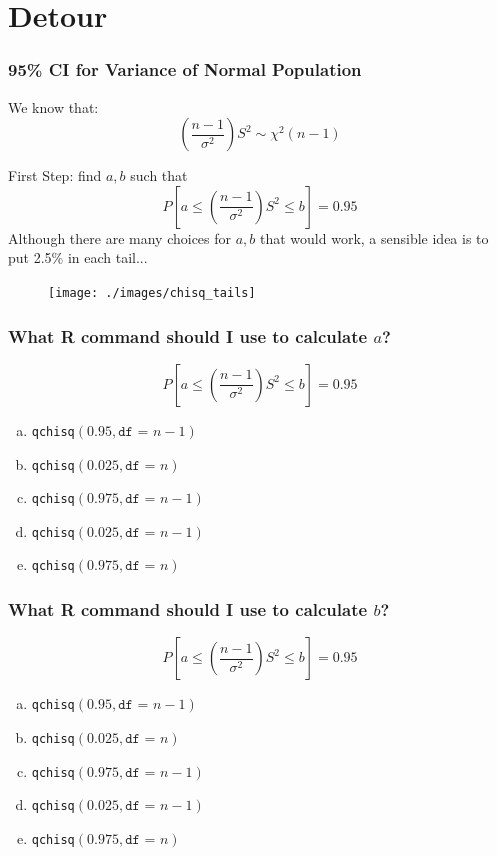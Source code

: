 \documentclass{beamer}
\begin{document}
\section{Detour}
\begin{frame}
\frametitle{95\% CI for Variance of Normal Population}
We know that:
	$$\left( \frac{n-1}{\sigma^2}\right)S^2\sim \chi^2(n-1)$$
	\pause
	\vspace{2em}
	
First Step: find $a,b$ such that 
	$$P\left[ a\leq   \left( \frac{n-1}{\sigma^2}\right)S^2 \leq b \right] = 0.95$$
	\pause
\alert{Although there are many choices for $a,b$ that would work, a sensible idea is to put 2.5\% in each tail...}
\end{frame}

\begin{frame}
\begin{figure}
\centering
\texttt{[image: ./images/chisq\_tails]}
\end{figure}
\end{frame}

\begin{frame}
\frametitle{What R command should I use to calculate $a$? }
$$P\left[ a\leq   \left( \frac{n-1}{\sigma^2}\right)S^2 \leq b \right] = 0.95$$
	\begin{enumerate}[(a)]
		\item \texttt{qchisq}$( 0.95, \texttt{df = } n-1)$
		\item \texttt{qchisq}$( 0.025, \texttt{df = }  n)$
		\item \texttt{qchisq}$(0.975, \texttt{df = }  n-1)$
		\item \texttt{qchisq}$( 0.025, \texttt{df = }  n-1)$
		\item \texttt{qchisq}$(0.975, \texttt{df = }  n)$
	\end{enumerate}
\end{frame}

\begin{frame}
\frametitle{What R command should I use to calculate $b$? }
$$P\left[ a\leq   \left( \frac{n-1}{\sigma^2}\right)S^2 \leq b \right] = 0.95$$
	\begin{enumerate}[(a)]
		\item \texttt{qchisq}$( 0.95, \texttt{df = } n-1)$
		\item \texttt{qchisq}$( 0.025, \texttt{df = }  n)$
		\item \texttt{qchisq}$(0.975, \texttt{df = }  n-1)$
		\item \texttt{qchisq}$( 0.025, \texttt{df = }  n-1)$
		\item \texttt{qchisq}$(0.975, \texttt{df = }  n)$
	\end{enumerate}
\end{frame}
\end{document}
